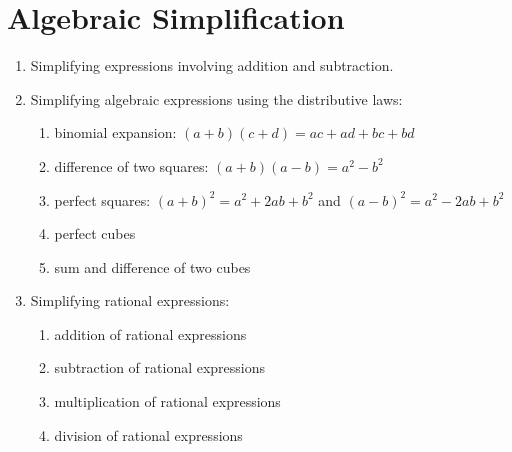 
\chapter{Algebraic Simplification}

\begin{enumerate}
\item Simplifying expressions involving addition and subtraction.

\item Simplifying algebraic expressions using the distributive laws:
  \begin{enumerate}
  \item binomial expansion: $(a + b)(c + d) = ac + ad + bc + bd$

  \item difference of two squares: $(a + b)(a - b) = a^2 - b^2$

  \item perfect squares: $(a + b)^2 = a^2 + 2ab + b^2$ and
    $(a - b)^2 = a^2 - 2ab + b^2$

  \item perfect cubes

  \item sum and difference of two cubes
  \end{enumerate}

\item Simplifying rational expressions:
  \begin{enumerate}
  \item addition of rational expressions

  \item subtraction of rational expressions

  \item multiplication of rational expressions

  \item division of rational expressions
  \end{enumerate}
\end{enumerate}
